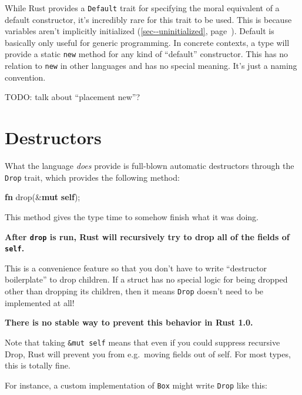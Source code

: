 \documentclass[a4paper,]{book}
\renewcommand*{\hyperref}[2][\ar]{%
  \def\ar{#2}%
  #2 (\autoref{#1}, page~\pageref{#1})}
\newenvironment{Shaded}{\begin{snugshade}}{\end{snugshade}}
\newcommand{\KeywordTok}[1]{\textcolor[rgb]{0.13,0.29,0.53}{\textbf{{#1}}}}
\newcommand{\NormalTok}[1]{{#1}}
\begin{document}
While Rust provides a \texttt{Default} trait for specifying the moral
equivalent of a default constructor, it's incredibly rare for this trait
to be used. This is because variables
\hyperref[sec--uninitialized]{aren't implicitly initialized}. Default is
basically only useful for generic programming. In concrete contexts, a
type will provide a static \texttt{new} method for any kind of
``default'' constructor. This has no relation to \texttt{new} in other
languages and has no special meaning. It's just a naming convention.

TODO: talk about ``placement new''?

\section{Destructors}\label{sec--destructors}

What the language \emph{does} provide is full-blown automatic
destructors through the \texttt{Drop} trait, which provides the
following method:

\begin{Shaded}
\begin{Highlighting}[]
\KeywordTok{fn} \NormalTok{drop(&}\KeywordTok{mut} \KeywordTok{self}\NormalTok{);}
\end{Highlighting}
\end{Shaded}

This method gives the type time to somehow finish what it was doing.

\textbf{After \texttt{drop} is run, Rust will recursively try to drop
all of the fields of \texttt{self}.}

This is a convenience feature so that you don't have to write
``destructor boilerplate'' to drop children. If a struct has no special
logic for being dropped other than dropping its children, then it means
\texttt{Drop} doesn't need to be implemented at all!

\textbf{There is no stable way to prevent this behavior in Rust 1.0.}

Note that taking \texttt{\&mut\ self} means that even if you could
suppress recursive Drop, Rust will prevent you from e.g.~moving fields
out of self. For most types, this is totally fine.

For instance, a custom implementation of \texttt{Box} might write
\texttt{Drop} like this:
\end{document}
